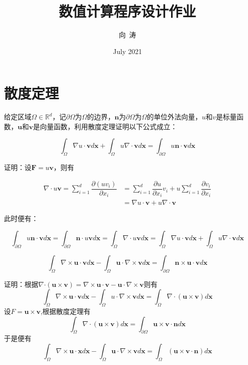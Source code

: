\documentclass{article}
\title{数值计算程序设计作业}
\author{向~涛}
\date{July 2021}
\begin{document}
\maketitle

\section{散度定理}

给定区域$\Omega \in \mathbb{R}^d$，记$\partial \Omega$为$\Omega$的边界，$\pmb{n}$为$\partial \Omega$为$\Omega$的单位外法向量，$u$和$v$是标量函数，$\pmb{u}$和$\pmb{v}$是向量函数，利用散度定理证明以下公式成立：

\begin{equation}
    \int_{\Omega} \nabla u \cdot \pmb{v} d \pmb{x} + \int_{\Omega} u \nabla \cdot\pmb{v} d \pmb{x} 
    =\int_{\partial\Omega} u \pmb{n} \cdot \pmb{v} d \pmb{x}
\end{equation}

证明：设$\pmb{F}=u\pmb{v}$，则有

\begin{align*}
    \nabla \cdot u \pmb{v} = \sum^{d}_{i=1} \dfrac{\partial(uv_i)}{\partial x_i} &= \sum^{d}_{i=1} 
    \dfrac{\partial u}{\partial x_i} v_i + u \sum^{d}_{i=1}
    \dfrac{\partial v_i}{\partial x_i}  \\
    &= \nabla u \cdot  \pmb{v} + u\nabla \cdot \pmb{v} 
\end{align*}

此时便有：

\begin{equation*}
    \int_{\partial\Omega}u\pmb{n}\cdot\pmb{v}d\pmb{x} = \int_{\partial\Omega}\pmb{n}\cdot u\pmb{v}d\pmb{x} = \int_{\Omega}\nabla \cdot u \pmb{v}d\pmb{x}=\int_{\Omega} \nabla u \cdot \pmb{v} d \pmb{x} + \int_{\Omega} u \nabla \cdot\pmb{v} d \pmb{x}
\end{equation*}

\begin{equation}
    \int_{\Omega}\nabla\times \pmb{u}\cdot \pmb{v} d\pmb{x}-\int_{\Omega} \pmb{u}\cdot\nabla\times \pmb{v} d\pmb{x} =\int_{\partial\Omega}\pmb{n}\times \pmb{u}\cdot \pmb{v} d\pmb{x}
\end{equation}

证明：根据$\nabla$$\cdot$$\left(\pmb{u}\times \pmb{v}\right)=\nabla\times \pmb{u}\cdot \pmb{v}-\pmb{u}\cdot\nabla \times \pmb{v}$则有\[\int_{\Omega}\nabla\times \pmb{u}\cdot \pmb{v}d\pmb{x}-\int_{\Omega}u\cdot\nabla\times \pmb{v} d\pmb{x}=\int_{\Omega}\nabla\cdot\left(\pmb{u}\times	 \pmb{v}\right)d\pmb{x}\]
设$F=\pmb{u}\times \pmb{v}$,根据散度定理有
\[\int_{\Omega}\nabla\cdot \left(\pmb{u}\times \pmb{v}\right)d\pmb{x}=\int_{\partial\Omega}\pmb{u}\times \pmb{v}\cdot \pmb{n}d\pmb{x}\]
于是便有\[\int_{\Omega}	\nabla\times \pmb{u}\cdot \pmb{x} d\pmb{x}-\int_{\Omega}\pmb{u}\cdot\nabla\times \pmb{v} d\pmb{x}=\int_{\Omega}\left(\pmb{u}\times \pmb{v}\cdot \pmb{n}\right)d\pmb{x}\]
\end{document}
